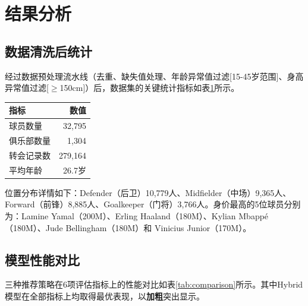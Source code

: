 \documentclass[a4paper]{article}
\begin{document}
\section{结果分析}

\subsection{数据清洗后统计}

经过数据预处理流水线（去重、缺失值处理、年龄异常值过滤[15-45岁范围]、身高异常值过滤[\(\geq\)150cm]）后，数据集的关键统计指标如表\ref{tab:stats}所示。

\begin{tcolorbox}[enhanced, colback=orange!3!white, colframe=orange!60!black,
  title=\textbf{表3：数据清洗后关键统计指标}, fonttitle=\bfseries,
  arc=4mm, boxrule=1pt, drop fuzzy shadow=orange!20]
\begin{table}[H]
\centering
\label{tab:stats}
\begin{tabular}{@{}lr@{}}
\toprule
\textbf{指标} & \textbf{数值} \\
\midrule
球员数量           & 32,795 \\
俱乐部数量          & 1,304 \\
转会记录数          & 279,164 \\
平均年龄            & 26.7岁 \\
\bottomrule
\end{tabular}
\end{table}
\end{tcolorbox}

位置分布详情如下：Defender（后卫）10,779人、Midfielder（中场）9,365人、Forward（前锋）8,885人、Goalkeeper（门将）3,766人。身价最高的5位球员分别为：Lamine Yamal（200M\texteuro）、Erling Haaland（180M\texteuro）、Kylian Mbappé（180M\texteuro）、Jude Bellingham（180M\texteuro）和 Vinicius Junior（170M\texteuro）。

\subsection{模型性能对比}

三种推荐策略在6项评估指标上的性能对比如表\ref{tab:comparison}所示。其中Hybrid模型在全部指标上均取得最优表现，以\textbf{加粗}突出显示。
\end{document}
